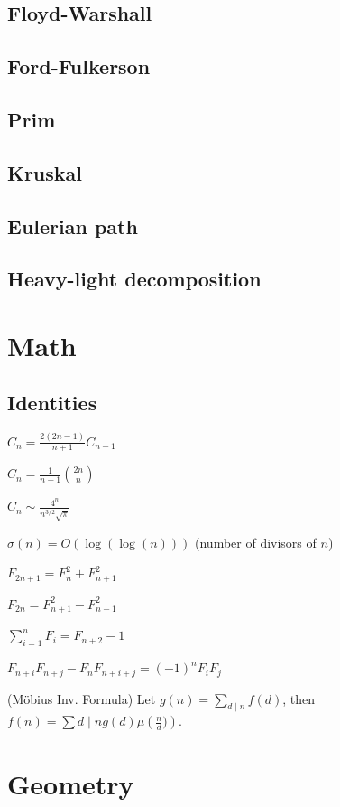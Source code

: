 \subsection{ Floyd-Warshall }
\subsection{ Ford-Fulkerson }
\subsection{ Prim }
\subsection{ Kruskal }
\subsection{ Eulerian path }
\subsection{ Heavy-light decomposition }

\section{Math}
\subsection{Identities}
{
	$C_n = \frac{2(2n-1)}{n+1} C_{n-1}$

	$C_n = \frac{1}{n+1} \binom{2n}{n}$

	$C_n \sim \frac{4^n}{n^{3/2}\sqrt{\pi}}$

	$\sigma(n) = O(\log(\log(n)))$ (number of divisors of $n$)

	$F_{2n+1} = F_{n}^2 + F_{n+1}^2$

	$F_{2n} = F_{n+1}^2 - F_{n-1}^2$

	$\sum_{i=1}^n F_i = F_{n+2}-1$

	$F_{n+i}F_{n+j} - F_nF_{n+i+j} = (-1)^n F_iF_j$

	(Möbius Inv. Formula)
	Let $g(n) = \sum_{d\mid n} f(d)$, then $f(n)=\sum{d\mid n} g(d) \mu\left(\frac{n}{d})\right)$.
}

\section{Geometry}
